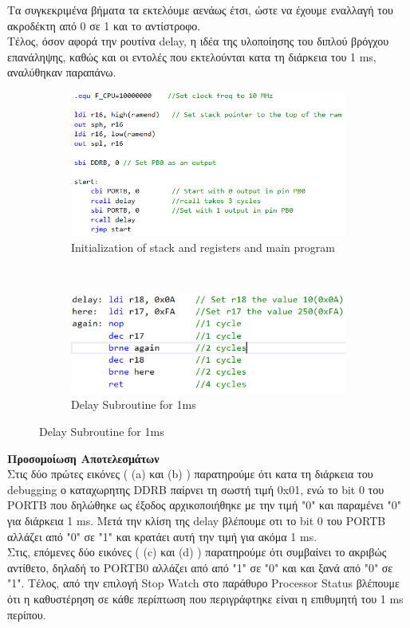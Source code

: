 \documentclass{article}
\begin{document}
	\noindent
	Τα συγκεκριμένα βήματα τα εκτελόυμε αενάως έτσι, ώστε να έχουμε εναλλαγή του ακροδέκτη από 0 σε 1 και το αντίστροφο. \\
	
	\noindent
	Τέλος, όσον αφορά την ρουτίνα delay, η ιδέα της υλοποίησης του διπλού βρόγχου επανάληψης, καθώς και οι εντολές που εκτελούνται κατα τη διάρκεια του 1 ms, αναλύθηκαν παραπάνω.\\	
		
	\begin{figure}[h!]
		\centering
		\begin{subfigure}[t]{0.5\textwidth}
			\centering
			\includegraphics[width=0.8\linewidth]{./results/lab1a_init_main.png}
			\caption{Initialization of stack and registers and main program}
		\end{subfigure}%
		~
		\begin{subfigure}[t]{0.5\textwidth}
			\centering
			\includegraphics[width=\linewidth]{./results/lab1a_delay_code.png}
			\caption{Delay Subroutine for 1ms}
		\end{subfigure}
	\end{figure}
	
	\noindent
	\textbf{Προσομοίωση Αποτελεσμάτων} \\
	\noindent
	Στις δύο πρώτες εικόνες ( (a) και (b) ) παρατηρούμε ότι κατα τη διάρκεια του debugging ο καταχωρητης DDRB παίρνει τη σωστή τιμή 0x01, ενώ το bit 0 του PORTB που δηλώθηκε ως έξοδος αρχικοποιήθηκε με την τιμή "0" και παραμένει "0" για διάρκεια 1 ms. Μετά την κλίση της delay βλέπουμε οτι το bit 0 του PORTB αλλάζει από "0" σε "1" και κρατάει αυτή την τιμή για ακόμα 1 ms. \\
	Στις, επόμενες δύο εικόνες ( (c) και (d) ) παρατηρούμε ότι συμβαίνει το ακριβώς αντίθετο, δηλαδή το PORTB0 αλλάζει από από "1" σε "0" και και ξανά από "0" σε "1". Tέλος, από την επιλογή Stop Watch στο παράθυρο Processor Status βλέπουμε ότι η καθυστέρηση σε κάθε περίπτωση που περιγράφτηκε είναι η επιθυμητή του 1 ms περίπου.\\
	
\end{document}
